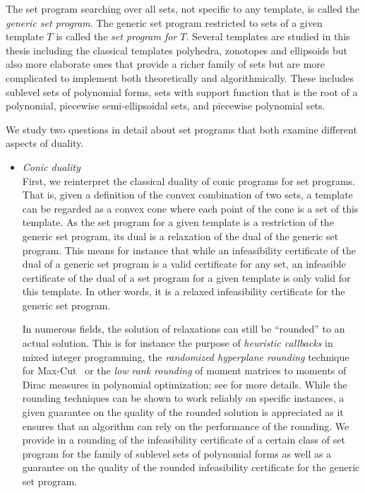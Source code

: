 The set program searching over all sets, not specific to any template, is called the \emph{generic set program}.
The generic set program restricted to sets of a given template $T$ is called the \emph{set program for $T$}.
Several templates are studied in this thesis including the classical templates polyhedra, zonotopes and ellipsoids
but also more elaborate ones that provide a richer family of sets but are more complicated to implement both theoretically and algorithmically.
These includes sublevel sets of polynomial forms, sets with support function that is the root of a polynomial,
piecewise semi-ellipsoidal sets, and piecewise polynomial sets.

We study two questions in detail about set programs that both examine different aspects of duality.

\begin{itemize}

\item \textit{Conic duality} \\

First, we reinterpret the classical duality of conic programs for set programs.
That is, given a definition of the convex combination of two sets, a template can be regarded as a convex cone where each point of the cone is a set of this template.
As the set program for a given template is a restriction of the generic set program,
its dual is a relaxation of the dual of the generic set program.
This means for instance that while an infeasibility certificate of the dual of a generic set program
is a valid certificate for any set,
an infeasible certificate of the dual of a set program for a given template is only
valid for this template.
In other words, it is a relaxed infeasibility certificate for the generic set program.

In numerous fields, the solution of relaxations can still be ``rounded'' to an actual solution.
This is for instance the purpose of \emph{heuristic callbacks} in mixed integer programming,
the \emph{randomized hyperplane rounding} technique for Max-Cut~\cite{goemans1995improved}
or the \emph{low rank rounding} of moment matrices to moments of Dirac measures in polynomial optimization; see  for more details.
While the rounding techniques can be shown to work reliably on specific instances,
a given guarantee on the quality of the rounded solution is appreciated
as it ensures that an algorithm can rely on the performance of the rounding.
We provide in  a rounding of the infeasibility certificate
of a certain class of set program for the family of sublevel sets of polynomial forms
as well as a guarantee on the quality of the rounded infeasibility certificate for the generic set program.


\end{itemize}
